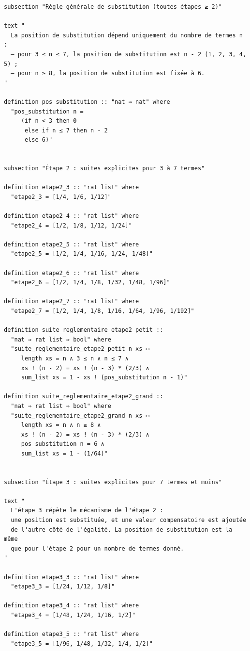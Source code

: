 \documentclass[a4paper,11pt]{article}
\begin{document}
\begin{holcode}[title={\textcolor{white}{Fichier : methode\_de\_philippot.thy -- COMPLET}}]
\begin{lstlisting}
subsection "Règle générale de substitution (toutes étapes ≥ 2)"

text "
  La position de substitution dépend uniquement du nombre de termes n :
  – pour 3 ≤ n ≤ 7, la position de substitution est n - 2 (1, 2, 3, 4, 5) ;
  – pour n ≥ 8, la position de substitution est fixée à 6.
"

definition pos_substitution :: "nat ⇒ nat" where
  "pos_substitution n =
     (if n < 3 then 0
      else if n ≤ 7 then n - 2
      else 6)"


subsection "Étape 2 : suites explicites pour 3 à 7 termes"

definition etape2_3 :: "rat list" where
  "etape2_3 = [1/4, 1/6, 1/12]"

definition etape2_4 :: "rat list" where
  "etape2_4 = [1/2, 1/8, 1/12, 1/24]"

definition etape2_5 :: "rat list" where
  "etape2_5 = [1/2, 1/4, 1/16, 1/24, 1/48]"

definition etape2_6 :: "rat list" where
  "etape2_6 = [1/2, 1/4, 1/8, 1/32, 1/48, 1/96]"

definition etape2_7 :: "rat list" where
  "etape2_7 = [1/2, 1/4, 1/8, 1/16, 1/64, 1/96, 1/192]"

definition suite_reglementaire_etape2_petit ::
  "nat ⇒ rat list ⇒ bool" where
  "suite_reglementaire_etape2_petit n xs ⟷
     length xs = n ∧ 3 ≤ n ∧ n ≤ 7 ∧
     xs ! (n - 2) = xs ! (n - 3) * (2/3) ∧
     sum_list xs = 1 - xs ! (pos_substitution n - 1)"

definition suite_reglementaire_etape2_grand ::
  "nat ⇒ rat list ⇒ bool" where
  "suite_reglementaire_etape2_grand n xs ⟷
     length xs = n ∧ n ≥ 8 ∧
     xs ! (n - 2) = xs ! (n - 3) * (2/3) ∧
     pos_substitution n = 6 ∧
     sum_list xs = 1 - (1/64)"


subsection "Étape 3 : suites explicites pour 7 termes et moins"

text "
  L'étape 3 répète le mécanisme de l'étape 2 :
  une position est substituée, et une valeur compensatoire est ajoutée
  de l'autre côté de l'égalité. La position de substitution est la même
  que pour l'étape 2 pour un nombre de termes donné.
"

definition etape3_3 :: "rat list" where
  "etape3_3 = [1/24, 1/12, 1/8]"

definition etape3_4 :: "rat list" where
  "etape3_4 = [1/48, 1/24, 1/16, 1/2]"

definition etape3_5 :: "rat list" where
  "etape3_5 = [1/96, 1/48, 1/32, 1/4, 1/2]"


\end{lstlisting}
\end{holcode}
\end{document}
